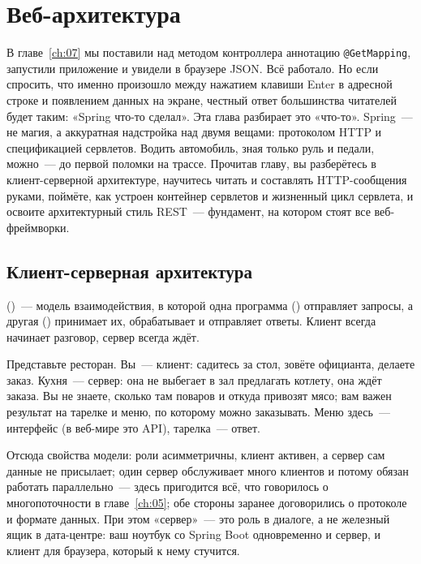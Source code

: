 \chapter{Веб-архитектура}
\label{ch:08}

В главе~\ref{ch:07} мы поставили над методом контроллера аннотацию
\texttt{@GetMapping}, запустили приложение и увидели в браузере JSON. Всё
работало. Но если спросить, что именно произошло между нажатием клавиши Enter в
адресной строке и появлением данных на экране, честный ответ большинства
читателей будет таким: «Spring что-то сделал». Эта глава разбирает это
«что-то». Spring~--- не магия, а аккуратная надстройка над двумя вещами:
протоколом HTTP и спецификацией сервлетов. Водить автомобиль, зная только руль
и педали, можно~--- до первой поломки на трассе. Прочитав главу, вы
разберётесь в клиент-серверной архитектуре, научитесь читать и составлять
HTTP-сообщения руками, поймёте, как устроен контейнер сервлетов и жизненный
цикл сервлета, и освоите архитектурный стиль REST~--- фундамент, на котором
стоят все веб-фреймворки.

\section{Клиент-серверная архитектура}

 ()~---
модель взаимодействия, в которой одна программа () отправляет
запросы, а другая () принимает их, обрабатывает и отправляет
ответы. Клиент всегда начинает разговор, сервер всегда ждёт.

Представьте ресторан. Вы~--- клиент: садитесь за стол, зовёте официанта,
делаете заказ. Кухня~--- сервер: она не выбегает в зал предлагать котлету, она
ждёт заказа. Вы не знаете, сколько там поваров и откуда привозят мясо; вам
важен результат на тарелке и меню, по которому можно заказывать. Меню здесь~---
интерфейс (в веб-мире это API), тарелка~--- ответ.

Отсюда свойства модели: роли асимметричны, клиент активен, а сервер сам данные
не присылает; один сервер обслуживает много клиентов и потому обязан работать
параллельно~--- здесь пригодится всё, что говорилось о многопоточности в
главе~\ref{ch:05}; обе стороны заранее договорились о протоколе и формате
данных. При этом «сервер»~--- это роль в диалоге, а не железный ящик в
дата-центре: ваш ноутбук со Spring Boot одновременно и сервер, и клиент для
браузера, который к нему стучится.

